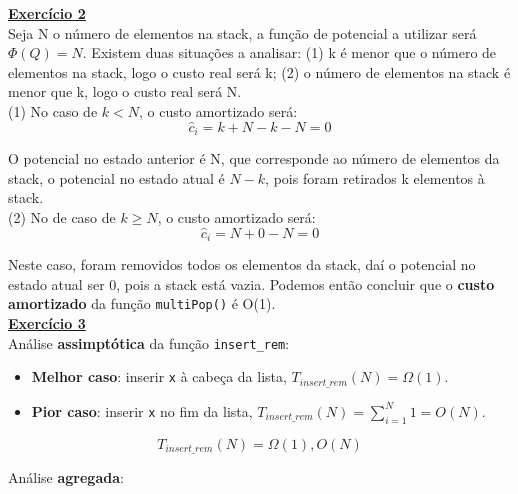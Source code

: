 \documentclass[a4paper,11pt]{article}
\begin{document}
	\noindent \underline{\textbf{Exercício 2}}\\
	
	\noindent Seja N o número de elementos na stack, a função de potencial a utilizar será $\Phi(Q) = N$. Existem duas situações a analisar: (1) k é menor que o número de elementos na stack, logo o custo real será k; (2) o número de elementos na stack é menor que k, logo o custo real será N.\\
	
	\noindent (1) No caso de $ k < N $, o custo amortizado será:
	\[
		\hat{c}_i = k + N - k - N = 0
	\]
	
	\noindent O potencial no estado anterior é N, que corresponde ao número de elementos da stack, o potencial no estado atual é $ N - k $, pois foram retirados k elementos à stack.\\
	
	\noindent (2) No de caso de $ k \geq N $, o custo amortizado será:
	\[
		\hat{c}_i = N + 0 - N = 0
	\]
	
	\noindent Neste caso, foram removidos todos os elementos da stack, daí o potencial no estado atual ser 0, pois a stack está vazia. Podemos então concluir que o \textbf{custo amortizado} da função \texttt{multiPop()} é O(1).\\
	
	
	\noindent \underline{\textbf{Exercício 3}}\\
	
	\noindent Análise \textbf{assimptótica} da função \texttt{insert\_rem}:
	\begin{itemize}
		\item \textbf{Melhor caso}: inserir \texttt{x} à cabeça da lista, $ T_{insert\_rem}(N) = \Omega(1) $.
		\item \textbf{Pior caso}: inserir \texttt{x} no fim da lista, $ T_{insert\_rem}(N) = \sum_{i=1}^{N} 1 = O(N) $.
	\end{itemize}
	\[
		T_{insert\_rem}(N) = \Omega(1), O(N)
	\]
	
	\noindent Análise \textbf{agregada}:
	
\end{document}
